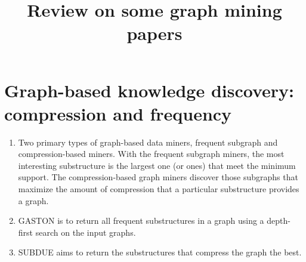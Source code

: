 \documentclass[14pt]{article}
\begin{document}
\title{Review on some graph mining papers}
\maketitle

\section{Graph-based knowledge discovery: compression and frequency}
\begin{enumerate}
 \item Two primary types of graph-based data miners, frequent subgraph and compression-based miners. With the frequent subgraph miners, the most interesting substructure is the largest one (or ones) that meet the minimum support. The compression-based graph miners discover those subgraphs that maximize the amount of compression that a particular substructure provides a graph.
 \item GASTON is to return all frequent substructures in a graph using a depth-first search on the input graphs.
 \item SUBDUE aims to return the substructures that compress the graph the best.
\end{enumerate}
\end{document}
